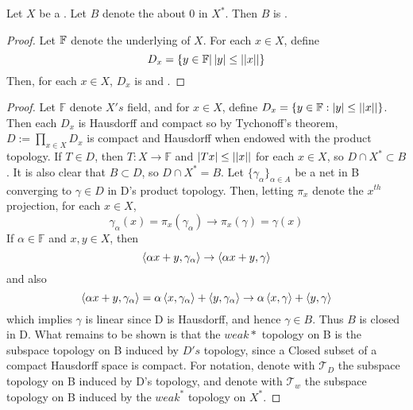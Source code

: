 \begin{thm}
    \label{thm:banachalaoglu}
    \rm
    Let $X$ be a \NormedSpace.
    Let $B$ denote the \ClosedUnitBall about $0$ in $X^*$. 
    Then $B$ is \weakstar \SetCompact.
    \begin{proof}
        Let $\mathbb{F}$ denote the underlying \Field of $X$.
        For each $x \in X$, define 
        \begin{equation*}
            D_x = \{y \in \mathbb{F} | \left| y \right| \leq \left|\left| x \right|\right|\}
        \end{equation*}
        Then, for each $x \in X$, $D_x$ is \Hausdorff and \SetCompact.
    \end{proof}


    \begin{proof}
        Let $\mathbb{F}$ denote $X's$ field, and for $x \in X$, define $D_x=\{y \in \mathbb{F}: \left| y \right| \leq \left|\left| x \right|\right|\}$. 
        Then each $D_x$ is Hausdorff and compact so by Tychonoff's theorem, $D:=\prod_{x \in X} D_x$ is compact and Hausdorff when endowed with the product topology. 
        If $T \in D$, then $T:X \to \mathbb{F}$ and $\left| Tx \right| \leq \left|\left| x \right|\right|$ for each $x \in X$, so $D \cap X^* \subset B$. 
        It is also clear that $B \subset D$, so $D \cap X^* = B$. 
        Let $\{\gamma_\alpha\}_{\alpha \in A}$ be a net in B converging to $\gamma \in D$ in D's product topology. 
        Then, letting $\pi_x$ denote the $x^{th}$ projection, for each $x \in X$, 
        \begin{equation}
            \gamma_{\alpha}(x) = \pi_x(\gamma_\alpha) \to \pi_x(\gamma) = \gamma(x)
        \end{equation}
        If $\alpha \in \mathbb{F}$ and $x,y \in X$, then 
        \begin{equation}
            \left\langle \alpha x+y, \gamma_\alpha \right\rangle \to \left\langle  \alpha x+y, \gamma \right\rangle
        \end{equation}
        and also
        \begin{equation}
            \left\langle \alpha x+y,\gamma_\alpha \right\rangle = \alpha \left\langle x,\gamma_\alpha \right\rangle+ \left\langle y,\gamma_\alpha \right\rangle \to \alpha \left\langle x,\gamma \right\rangle+\left\langle y,\gamma \right\rangle
        \end{equation}
        which implies $\gamma$ is linear since D is Hausdorff, and hence $\gamma \in B$. 
        Thus $B$ is closed in D. What remains to be shown is that the $weak*$ topology on B is the subspace topology on B induced by $D's$ topology, since a Closed subset of a compact Hausdorff space is compact. 
        For notation, denote with $\mathcal{T}_D$ the subspace topology on B induced by D's topology, and denote with $\mathcal{T}_w$ the subspace topology on B induced by the  $weak^*$ topology on $X^*$. 

\end{proof}
\end{thm}
